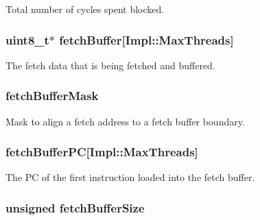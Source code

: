 Total number of cycles spent blocked. \hypertarget{classDefaultFetch_a924f2775385b2e5ac3008db4b8305c2b}{
\subsubsection[{fetchBuffer}]{\setlength{\rightskip}{0pt plus 5cm}uint8\_\-t$\ast$ {\bf fetchBuffer}\mbox{[}Impl::MaxThreads\mbox{]}}}
\label{classDefaultFetch_a924f2775385b2e5ac3008db4b8305c2b}
The fetch data that is being fetched and buffered. \hypertarget{classDefaultFetch_a9fb9a70efc5e29795473f1f92c082063}{
\subsubsection[{fetchBufferMask}]{ {\bf fetchBufferMask}}}
\label{classDefaultFetch_a9fb9a70efc5e29795473f1f92c082063}
Mask to align a fetch address to a fetch buffer boundary. \hypertarget{classDefaultFetch_ab4b128217e67bdf9f6a98420b82cacb9}{
\subsubsection[{fetchBufferPC}]{ {\bf fetchBufferPC}\mbox{[}Impl::MaxThreads\mbox{]}}}
\label{classDefaultFetch_ab4b128217e67bdf9f6a98420b82cacb9}
The PC of the first instruction loaded into the fetch buffer. \hypertarget{classDefaultFetch_ac47806923c3481b83636c4aa03d184f8}{
\subsubsection[{fetchBufferSize}]{\setlength{\rightskip}{0pt plus 5cm}unsigned {\bf fetchBufferSize}}}

